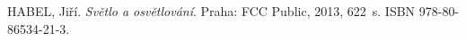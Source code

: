 \begin{thebibliography}{1}

HABEL, Jiří. \textit{Světlo a osvětlování}. Praha: FCC Public, 2013, 622~s. ISBN 978-80-86534-21-3. 

\end{thebibliography}